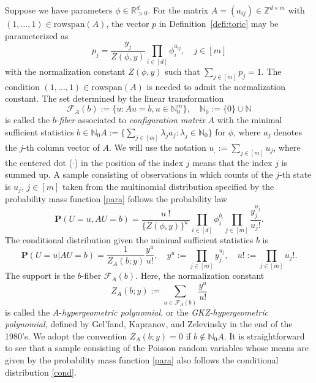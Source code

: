 \documentclass[a4paper,12pt]{article}
\theoremstyle{plain}
\theoremstyle{remark}
\begin{document}
Suppose we have parameters $\phi\in\mathbb{R}_{>0}^d$. For the matrix
$A=(a_{ij})\in\mathbb{Z}^{d\times m}$ with
$(1,\ldots,1)\in \text{rowspan}(A)$, the vector $p$ in
Definition~\ref{defi:toric} may be parameterized as
\begin{equation}
  p_j=\frac{y_j}{Z(\phi,y)}
  \prod_{i\in[d]}\phi_i^{a_{ij}},
  \quad j \in [m]
  \label{para}
\end{equation}
with the normalization constant $Z(\phi,y)$ such that
$\sum_{j\in[m]} p_j=1$. The condition
$(1,\ldots,1)\in \text{rowspan}(A)$ is needed to admit 
the normalization constant. The set determined by the linear
transformation
\begin{equation}
  \mathcal{F}_A(b):=\{u:Au=b,u\in\mathbb{N}_0^m\},
  \quad \mathbb{N}_0:=\{0\}\cup\mathbb{N}
  \label{fiber}
\end{equation}
is called the $b$-{\it fiber} associated to
{\it configuration matrix} $A$ with the minimal sufficient
statistics
$b\in\mathbb{N}_0A:=\{\sum_{j\in[m]}\lambda_ja_j:\lambda_j\in\mathbb{N}_0\}$
for $\phi$, where $a_j$ denotes the $j$-th column vector of
$A$. We will use the notation $u_.:=\sum_{j\in[m]}u_j$, where
the centered dot ($\cdot$) in the position of the index $j$
means that the index $j$ is summed up. A sample consisting of
observations in which counts of the $j$-th state is $u_j$,
$j\in[m]$ taken from the multinomial distribution specified
by the probability mass function \eqref{para} follows
the probability law
\[
  \mathbf{P}(U=u,AU=b)=\frac{u_.!}{\{Z(\phi,y)\}^{u_.}}
  \prod_{i\in[d]}\phi_i^{b_i}
  \prod_{j\in[m]}\frac{y_j^{u_j}}{u_j!}.
\]
The conditional distribution given the minimal sufficient
statistics $b$ is
\begin{equation}
  \mathbf{P}(U=u|AU=b)=\frac{1}{Z_A(b;y)}\frac{y^u}{u!},
  \quad y^u:=\prod_{j\in [m]}y_j^{u_j}, \quad
  u!:=\prod_{j\in[m]}u_j!.
  \label{cond}
\end{equation}
The support is the $b$-fiber $\mathcal{F}_A(b)$.
Here, the normalization constant
\begin{equation}
  Z_A(b;y):=\sum_{u\in \mathcal{F}_A(b)}\frac{y^u}{u!}
  \label{Apol}
\end{equation}
is called the $A$-{\it hypergeometric polynomial,} or
the {\it GKZ-hypergeometric polynomial,} defined by Gel'fand,
Kapranov, and Zelevinsky in the end of the 1980's.
We adopt the convention $Z_A(b;y)=0$ if $b\notin\mathbb{N}_0A$.
It is straightforward to see that a sample consisting of
the Poisson random variables whose means are given by
the probability mass function \eqref{para} also follows
the conditional distribution \eqref{cond}.
\end{document}
